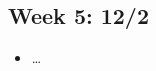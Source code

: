 \documentclass[english]{article}
\begin{document}
\subsection*{Week 5: 12/2}

\begin{itemize}
    \item \ldots
\end{itemize}










\newpage



\end{document}
